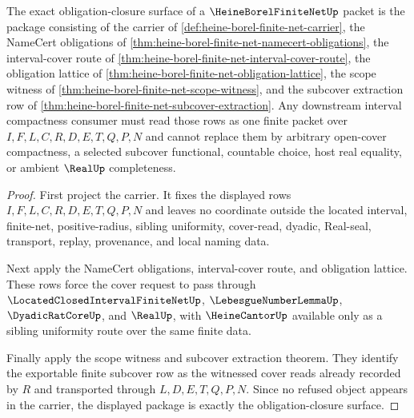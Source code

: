 \begin{theorem}
\label{thm:heine-borel-finite-net-obligation-closure-package}
The exact obligation-closure surface of a $\HeineBorelFiniteNetUp$ packet is the package consisting of the carrier of \autoref{def:heine-borel-finite-net-carrier}, the NameCert obligations of \autoref{thm:heine-borel-finite-net-namecert-obligations}, the interval-cover route of \autoref{thm:heine-borel-finite-net-interval-cover-route}, the obligation lattice of \autoref{thm:heine-borel-finite-net-obligation-lattice}, the scope witness of \autoref{thm:heine-borel-finite-net-scope-witness}, and the subcover extraction row of \autoref{thm:heine-borel-finite-net-subcover-extraction}. Any downstream interval compactness consumer must read those rows as one finite packet over $I,F,L,C,R,D,E,T,Q,P,N$ and cannot replace them by arbitrary open-cover compactness, a selected subcover functional, countable choice, host real equality, or ambient $\RealUp$ completeness.
\end{theorem}
\begin{proof}
First project the carrier. It fixes the displayed rows $I,F,L,C,R,D,E,T,Q,P,N$ and leaves no coordinate outside the located interval, finite-net, positive-radius, sibling uniformity, cover-read, dyadic, Real-seal, transport, replay, provenance, and local naming data.

Next apply the NameCert obligations, interval-cover route, and obligation lattice. These rows force the cover request to pass through $\LocatedClosedIntervalFiniteNetUp$, $\LebesgueNumberLemmaUp$, $\DyadicRatCoreUp$, and $\RealUp$, with $\HeineCantorUp$ available only as a sibling uniformity route over the same finite data.

Finally apply the scope witness and subcover extraction theorem. They identify the exportable finite subcover row as the witnessed cover reads already recorded by $R$ and transported through $L,D,E,T,Q,P,N$. Since no refused object appears in the carrier, the displayed package is exactly the obligation-closure surface.
\end{proof}

